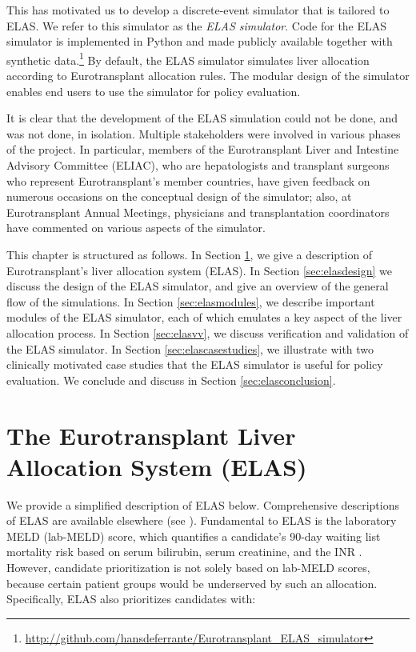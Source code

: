 \documentclass[11pt,twoside,]{book}
\let\rmarkdownfootnote\footnote%
\def\footnote{\protect\rmarkdownfootnote}
\begin{document}
This has motivated us to develop a discrete-event simulator that is tailored to
ELAS. We refer to this simulator as the \emph{ELAS simulator}. Code for the
ELAS simulator is implemented in Python and made publicly available
together with synthetic data.\footnote{\url{http://github.com/hansdeferrante/Eurotransplant_ELAS_simulator}} By default, the ELAS simulator
simulates liver allocation according to Eurotransplant allocation rules.
The modular design of the simulator enables end users to use the
simulator for policy evaluation.

It is clear that the development of the ELAS simulation could not be
done, and was not done, in isolation. Multiple stakeholders were involved
in various phases of the project. In particular, members of the
Eurotransplant Liver and Intestine Advisory Committee (ELIAC), who are hepatologists and transplant surgeons who represent
Eurotransplant's member countries, have given feedback on numerous
occasions on the conceptual design of the simulator; also, at
Eurotransplant Annual Meetings, physicians and transplantation
coordinators have commented on various aspects of the simulator.

This chapter is structured as follows. In Section \ref{sec:elassystem}, we give a
description of Eurotransplant's liver allocation system (ELAS). In
Section \ref{sec:elasdesign} we
discuss the design of the ELAS simulator, and give an overview of the
general flow of the simulations. In Section
\ref{sec:elasmodules}, we
describe important modules of the ELAS simulator, each of which emulates
a key aspect of the liver allocation process. In Section
\ref{sec:elasvv},
we discuss verification and validation of the ELAS simulator. In Section
\ref{sec:elascasestudies}, we illustrate with two clinically
motivated case studies that the ELAS simulator is useful for policy
evaluation. We conclude and discuss in Section
\ref{sec:elasconclusion}.

\section{The Eurotransplant Liver Allocation System (ELAS)}\label{sec:elassystem}

We provide a simplified description of ELAS below. Comprehensive descriptions of ELAS
are available elsewhere
(see \citep{jochmansAdultLiverAllocation2017, ETLiverMan2025}). Fundamental to
ELAS is the laboratory MELD (lab-MELD) score, which quantifies a
candidate's 90-day waiting list mortality risk based on serum bilirubin,
serum creatinine, and the INR
\citep{kamathModelPredictSurvival2001}. However, candidate prioritization is not solely based on
lab-MELD scores, because certain patient groups would be underserved by
such an allocation.
\newpage
Specifically, ELAS also prioritizes candidates with:
\end{document}
